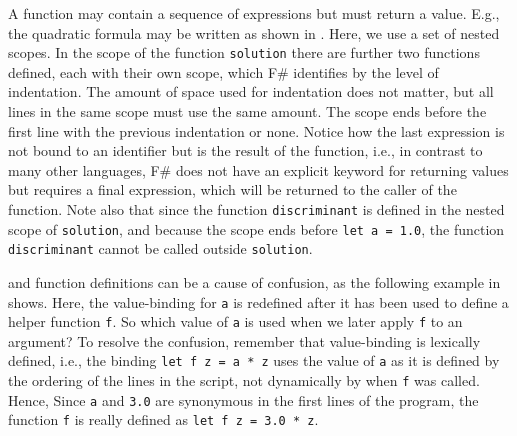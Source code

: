 \documentclass[fsharpNotes.tex]{subfiles}
\begin{document}
A function may contain a sequence of expressions but must return a value. E.g., the quadratic formula may be written as shown in . 
%
%
Here, we use a set of nested scopes. In the scope of the function \lstinline{solution} there are further two functions defined, each with their own scope, which F\# identifies by the level of indentation. The amount of space used for indentation does not matter, but all lines in the same scope must use the same amount. The scope ends before the first line with the previous indentation or none. Notice how the last expression is not bound to an identifier but is the result of the function, i.e., in contrast to many other languages, F\# does not have an explicit keyword for returning values but requires a final expression, which will be returned to the caller of the function. Note also that since the function \lstinline!discriminant! is defined in the nested scope of \lstinline!solution!, and because the scope ends before \lstinline!let a = 1.0!, the function \lstinline!discriminant! cannot be called outside \lstinline!solution!.

 and function definitions can be a cause of confusion, as the following example in  shows.
%
%
Here, the value-binding for \lstinline!a! is redefined after it has been used to define a helper function \lstinline!f!. So which value of \lstinline!a! is used when we later apply \lstinline!f! to an argument? To resolve the confusion, remember that value-binding is lexically defined, i.e., the binding \lstinline!let f z = a * z! uses the value of \lstinline!a! as it is defined by the ordering of the lines in the script, not dynamically by when \lstinline!f! was called. Hence,  Since \lstinline!a! and \lstinline!3.0! are synonymous in the first lines of the program, the function \lstinline!f! is really defined as \lstinline!let f z = 3.0 * z!.
\end{document}

